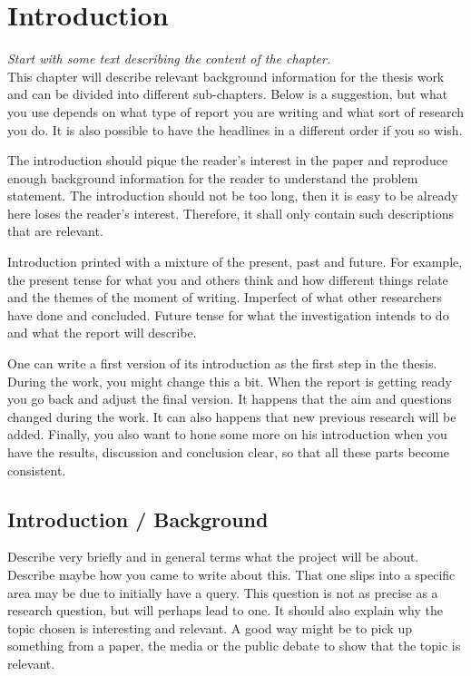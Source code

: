 \chapter{Introduction}
\emph{Start with some text describing the content of the chapter.}\\

\noindent This chapter will describe relevant background information for the thesis work and can be divided into different sub-chapters. Below is a suggestion, but what you use depends on what type of report you are writing and what sort of research you do. It is also possible to have the headlines in a different order if you so wish.

The introduction should pique the reader's interest in the paper and reproduce enough background information for the reader to understand the problem statement. The introduction should not be too long, then it is easy to be already here loses the reader's interest. Therefore, it shall only contain such descriptions that are relevant.

Introduction printed with a mixture of the present, past and future. For example, the present tense for what you and others think and how different things relate and the themes of the moment of writing. Imperfect of what other researchers have done and concluded. Future tense for what the investigation intends to do and what the report will describe.

One can write a first version of its introduction as the first step in the thesis. During the work, you might change this a bit. When the report is getting ready you go back and adjust the final version. It happens that the aim and questions changed during the work. It can also happens that new previous research will be added. Finally, you also want to hone some more on his introduction when you have the results, discussion and conclusion clear, so that all these parts become consistent.

\section{Introduction / Background}
Describe very briefly and in general terms what the project will be about. Describe maybe how you came to write about this. That one slips into a specific area may be due to initially have a query. This question is not as precise as a research question, but will perhaps lead to one. It should also explain why the topic chosen is interesting and relevant. A good way might be to pick up something from a paper, the media or the public debate to show that the topic is relevant.

